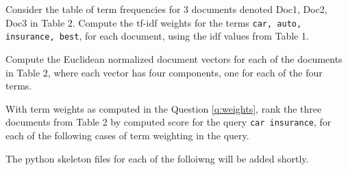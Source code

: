 \documentclass[addpoints]{exam}
\begin{document}
\begin{questions}
  \question[10]
  Consider the table of term frequencies for 3 documents denoted Doc1, Doc2, Doc3 in Table 2. Compute the tf-idf weights for the terms {\tt car, auto, insurance, best}, for each document, using the idf values from Table 1.

  \begin{solution}
  \end{solution}

  \question[10]
  \label{q:weights}
  Compute the Euclidean normalized document vectors for each of the documents in Table 2, where each vector has four components, one for each of the four terms.

  \begin{solution}
  \end{solution}

  \question
  With term weights as computed in the Question \ref{q:weights}, rank the three documents from Table 2 by computed score for the query {\tt car insurance}, for each of the following cases of term weighting in the query.

  The python skeleton files for each of the folloiwng will be added shortly.

\end{questions}
\end{document}
